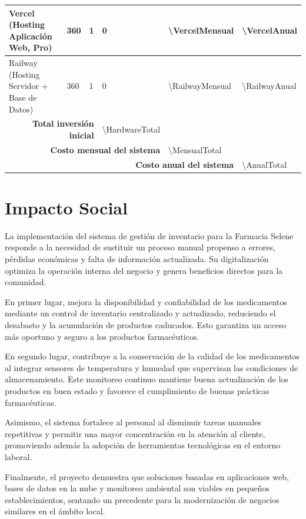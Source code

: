 \begin{center}
\begin{longtable}{
  | p{3cm}      %
  | p{2cm}      %
  | p{1.5cm}    %
  | p{2cm}      %
  | p{2cm}      %
  | p{2cm} |    %
}
Vercel (Hosting Aplicación Web, Pro) & \num{360} & 1 & 0 & \num{\VercelMensual} & \num{\VercelAnual} \\
\hline
Railway (Hosting Servidor + Base de Datos) & \num{360} & 1 & 0 & \num{\RailwayMensual} & \num{\RailwayAnual} \\
\hline

\multicolumn{3}{|r|}{\textbf{Total inversión inicial}} & \num{\HardwareTotal} & & \\
\hline
\multicolumn{4}{|r|}{\textbf{Costo mensual del sistema}} & \num{\MensualTotal} & \\
\hline
\multicolumn{5}{|r|}{\textbf{Costo anual del sistema}} & \num{\AnualTotal} \\
\hline

\end{longtable}
\end{center}
\newpage

\section{Impacto Social}

La implementación del sistema de gestión de inventario para la Farmacia Selene responde a la necesidad de sustituir un proceso manual propenso a errores, pérdidas económicas y falta de información actualizada. Su digitalización optimiza la operación interna del negocio y genera beneficios directos para la comunidad.

En primer lugar, mejora la disponibilidad y confiabilidad de los medicamentos mediante un control de inventario centralizado y actualizado, reduciendo el desabasto y la acumulación de productos caducados. Esto garantiza un acceso más oportuno y seguro a los productos farmacéuticos.

En segundo lugar, contribuye a la conservación de la calidad de los medicamentos al integrar sensores de temperatura y humedad que supervisan las condiciones de almacenamiento. Este monitoreo continuo mantiene buena actualización de los productos en buen estado y favorece el cumplimiento de buenas prácticas farmacéuticas.

Asimismo, el sistema fortalece al personal al disminuir tareas manuales repetitivas y permitir una mayor concentración en la atención al cliente, promoviendo además la adopción de herramientas tecnológicas en el entorno laboral.

Finalmente, el proyecto demuestra que soluciones basadas en aplicaciones web, bases de datos en la nube y monitoreo ambiental son viables en pequeños establecimientos, sentando un precedente para la modernización de negocios similares en el ámbito local.


